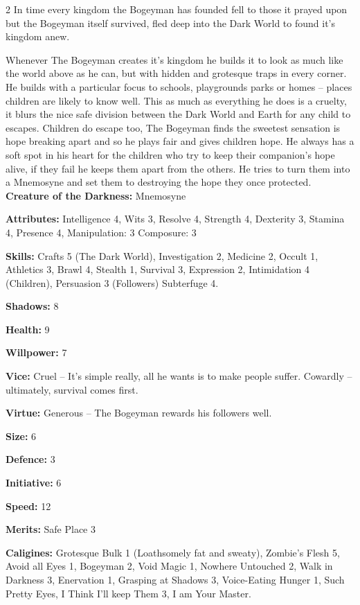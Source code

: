 \begin{multicols}{2}
In time every kingdom the Bogeyman has founded fell to those it prayed upon but the Bogeyman itself survived, fled deep into the Dark World to found it's kingdom anew.

Whenever The Bogeyman creates it's kingdom he builds it to look as much like the world above as he can, but with hidden and grotesque traps in every corner. He builds with a particular focus to schools, playgrounds parks or homes – places children are likely to know well. This as much as everything he does is a cruelty, it blurs the nice safe division between the Dark World and Earth for any child to escapes. Children do escape too, The Bogeyman finds the sweetest sensation is hope breaking apart and so he plays fair and gives children hope. He always has a soft spot in his heart for the children who try to keep their companion's hope alive, if they fail he keeps them apart from the others. He tries to turn them into a Mnemosyne and set them to destroying the hope they once protected.\\

\noindent \textbf{Creature of the Darkness:} Mnemosyne

\noindent \textbf{Attributes:} Intelligence 4, Wits 3, Resolve 4, Strength 4, Dexterity 3, Stamina 4, Presence 4, Manipulation: 3 Composure: 3

\noindent \textbf{Skills:} Crafts 5 (The Dark World), Investigation 2, Medicine 2, Occult 1, Athletics 3, Brawl 4, Stealth 1, Survival 3, Expression 2, Intimidation 4 (Children), Persuasion 3 (Followers) Subterfuge 4.

\noindent \textbf{Shadows:} 8

\noindent \textbf{Health:} 9 

\noindent \textbf{Willpower:} 7

\noindent \textbf{Vice:} Cruel – It's simple really, all he wants is to make people suffer. Cowardly – ultimately, survival comes first. 

\noindent \textbf{Virtue:} Generous – The Bogeyman rewards his followers well.

\noindent \textbf{Size:} 6

\noindent \textbf{Defence:} 3

\noindent \textbf{Initiative:} 6 

\noindent \textbf{Speed:} 12 

\noindent \textbf{Merits:} Safe Place 3

\noindent \textbf{Caligines:} Grotesque Bulk 1 (Loathsomely fat and sweaty), Zombie's Flesh 5, Avoid all Eyes 1, Bogeyman 2, Void Magic 1, Nowhere Untouched 2, Walk in Darkness 3, Enervation 1, Grasping at Shadows 3, Voice-Eating Hunger 1, Such Pretty Eyes, I Think I'll keep Them 3, I am Your Master.


\end{multicols}
